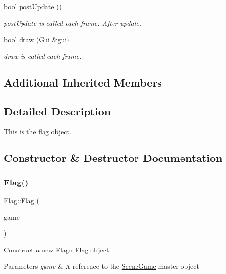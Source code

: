 \begin{DoxyCompactItemize}
bool \hyperlink{class_flag_a1840a0949762e3e62bf156be6e173d1e}{post\+Update} ()
\begin{DoxyCompactList}\small\item\em post\+Update is called each frame. After update. \end{DoxyCompactList}\item 
bool \hyperlink{class_flag_ae24cc9c0e3cc3378e12af9f40c0ee93d}{draw} (\hyperlink{class_gui}{Gui} \&gui)
\begin{DoxyCompactList}\small\item\em draw is called each frame. \end{DoxyCompactList}\end{DoxyCompactItemize}
\subsection*{Additional Inherited Members}


\subsection{Detailed Description}
This is the flag object. 

\subsection{Constructor \& Destructor Documentation}
\mbox{\label{class_flag_a0e6e8ac4f2fcd1ae0f98c17c68b4ecb1}} 
\subsubsection{\texorpdfstring{Flag()}{Flag()}\hspace{0.1cm}{\footnotesize\ttfamily [1/2]}}
{\footnotesize\ttfamily Flag\+::\+Flag (\begin{DoxyParamCaption}\item[{\hyperlink{class_scene_game}{Scene\+Game} \&}]{game }\end{DoxyParamCaption})\hspace{0.3cm}{\ttfamily [explicit]}}



Construct a new \hyperlink{class_flag}{Flag}\+:\+: \hyperlink{class_flag}{Flag} object. 


\begin{DoxyParams}{Parameters}
{\em game} & A reference to the \hyperlink{class_scene_game}{Scene\+Game} master object \\
\hline
\end{DoxyParams}
\mbox{\label{class_flag_a23da423347ebdedd5772a1e683d8c0c7}} 
